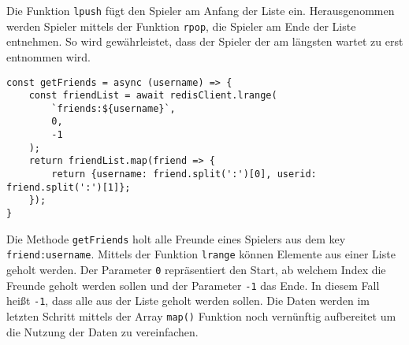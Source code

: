 Die Funktion \verb|lpush| fügt den Spieler am Anfang der Liste ein. Herausgenommen werden Spieler mittels der Funktion \verb|rpop|, die Spieler am Ende der Liste entnehmen. So wird gewährleistet, dass der Spieler der am längsten wartet zu erst entnommen wird.


\begin{lstlisting}[style=codeStyle, caption={Methode um Freunde eines Spielers zu erhalten}, label={lst:getFriends}]
const getFriends = async (username) => {
    const friendList = await redisClient.lrange(
        `friends:${username}`,
        0,
        -1
    );
    return friendList.map(friend => {
        return {username: friend.split(':')[0], userid: friend.split(':')[1]};
    });
}
\end{lstlisting}

Die Methode \verb|getFriends| holt alle Freunde eines Spielers aus dem key \verb|friend:username|. Mittels der Funktion \verb|lrange| können Elemente aus einer Liste geholt werden. Der Parameter \verb|0| repräsentiert den Start, ab welchem Index die Freunde geholt werden sollen und der Parameter \verb|-1| das Ende. In diesem Fall heißt \verb|-1|, dass alle aus der Liste geholt werden sollen. Die Daten werden im letzten Schritt mittels der Array \verb|map()| Funktion noch vernünftig aufbereitet um die Nutzung der Daten zu vereinfachen.

